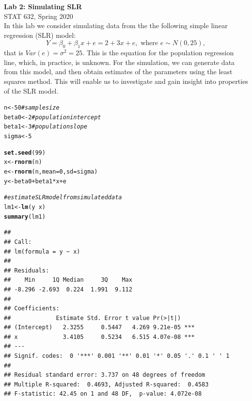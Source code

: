 \documentclass[11pt]{article}\usepackage[]{graphicx}\usepackage[]{color}
\makeatletter
\newcommand{\hlnum}[1]{\textcolor[rgb]{0.686,0.059,0.569}{#1}}%
\newcommand{\hlcom}[1]{\textcolor[rgb]{0.678,0.584,0.686}{\textit{#1}}}%
\newcommand{\hlopt}[1]{\textcolor[rgb]{0,0,0}{#1}}%
\newcommand{\hlstd}[1]{\textcolor[rgb]{0.345,0.345,0.345}{#1}}%
\newcommand{\hlkwb}[1]{\textcolor[rgb]{0.69,0.353,0.396}{#1}}%
\newcommand{\hlkwc}[1]{\textcolor[rgb]{0.333,0.667,0.333}{#1}}%
\newcommand{\hlkwd}[1]{\textcolor[rgb]{0.737,0.353,0.396}{\textbf{#1}}}%
\newenvironment{kframe}{%
 \def\at@end@of@kframe{}%
 \ifinner\ifhmode%
  \def\at@end@of@kframe{\end{minipage}}%
  \begin{minipage}{\columnwidth}%
 \fi\fi%
 \def\FrameCommand##1{\hskip\@totalleftmargin \hskip-\fboxsep
 \colorbox{shadecolor}{##1}\hskip-\fboxsep
     \hskip-\linewidth \hskip-\@totalleftmargin \hskip\columnwidth}%
 \MakeFramed {\advance\hsize-\width
   \@totalleftmargin\z@ \linewidth\hsize
   \@setminipage}}%
 {\par\unskip\endMakeFramed%
 \at@end@of@kframe}
\newenvironment{knitrout}{}{} %
\makeatother
\begin{document}
\setlength\parindent{0pt}

\large \textbf{Lab 2: Simulating SLR}\\
\normalsize STAT 632, Spring 2020\\

In this lab we consider simulating data from the the following simple linear regression (SLR) model:
$$Y = \beta_0 + \beta_1 x + e = 2 + 3x + e, \text{ where } e \sim N(0, 25),$$
that is $Var(e) = \sigma^2 = 25$.  This is the equation for the population regression line, which, in practice, is unknown.  For the simulation, we can generate data from this model, and then obtain estimates of the parameters using the least squares method.  This will enable us to investigate and gain insight into properties of the SLR model.  


\begin{knitrout}
\color{fgcolor}\begin{kframe}
\begin{alltt}
\hlstd{n} \hlkwb{<-} \hlnum{50} \hlcom{# sample size}
\hlstd{beta0} \hlkwb{<-} \hlnum{2} \hlcom{# population intercept}
\hlstd{beta1} \hlkwb{<-} \hlnum{3} \hlcom{# population slope}
\hlstd{sigma} \hlkwb{<-} \hlnum{5}

\hlkwd{set.seed}\hlstd{(}\hlnum{99}\hlstd{)}
\hlstd{x} \hlkwb{<-} \hlkwd{rnorm}\hlstd{(n)}
\hlstd{e} \hlkwb{<-} \hlkwd{rnorm}\hlstd{(n,} \hlkwc{mean}\hlstd{=}\hlnum{0}\hlstd{,} \hlkwc{sd}\hlstd{=sigma)}
\hlstd{y} \hlkwb{<-} \hlstd{beta0} \hlopt{+} \hlstd{beta1} \hlopt{*} \hlstd{x} \hlopt{+} \hlstd{e}

\hlcom{# estimate SLR model from simulated data}
\hlstd{lm1} \hlkwb{<-} \hlkwd{lm}\hlstd{(y} \hlopt{~} \hlstd{x)}
\hlkwd{summary}\hlstd{(lm1)}
\end{alltt}
\begin{verbatim}
## 
## Call:
## lm(formula = y ~ x)
## 
## Residuals:
##    Min     1Q Median     3Q    Max 
## -8.296 -2.693  0.224  1.991  9.112 
## 
## Coefficients:
##             Estimate Std. Error t value Pr(>|t|)    
## (Intercept)   2.3255     0.5447   4.269 9.21e-05 ***
## x             3.4105     0.5234   6.515 4.07e-08 ***
## ---
## Signif. codes:  0 '***' 0.001 '**' 0.01 '*' 0.05 '.' 0.1 ' ' 1
## 
## Residual standard error: 3.737 on 48 degrees of freedom
## Multiple R-squared:  0.4693,	Adjusted R-squared:  0.4583 
## F-statistic: 42.45 on 1 and 48 DF,  p-value: 4.072e-08
\end{verbatim}
\end{kframe}
\end{knitrout}
\end{document}
